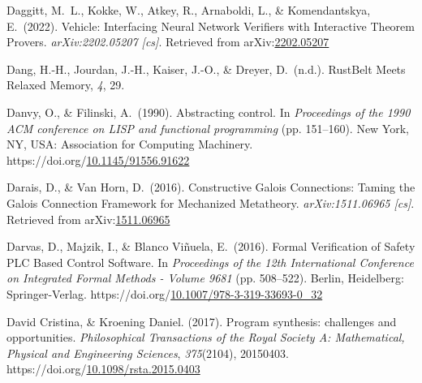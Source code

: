 \documentclass[12pt,twoside]{article}
\begin{document}
{\begin{thebibliography}{1079}
\mdbibitemlabel{}Daggitt, M.~L., Kokke, W., Atkey, R., Arnaboldi, L., \& Komendantskya, E.~(2022). Vehicle: Interfacing Neural Network Verifiers with Interactive Theorem Provers. \emph{arXiv:2202.05207 {}[cs]}. Retrieved from arXiv:\href{http://arxiv.org/abs/2202.05207}{2202.05207}%

\mdbibitemlabel{}Dang, H.-H., Jourdan, J.-H., Kaiser, J.-O., \& Dreyer, D.~(n.d.). RustBelt Meets Relaxed Memory, \emph{4}, 29.%

\mdbibitemlabel{}Danvy, O., \& Filinski, A.~(1990). Abstracting control. In \emph{Proceedings of the 1990 ACM conference on LISP and functional programming} (pp. 151–160). New York, NY, USA: Association for Computing Machinery. https://doi.org/\href{https://dx.doi.org/10.1145/91556.91622}{10.1145/91556.91622}%

\mdbibitemlabel{}Darais, D., \& Van Horn, D.~(2016). Constructive Galois Connections: Taming the Galois Connection Framework for Mechanized Metatheory. \emph{arXiv:1511.06965 {}[cs]}. Retrieved from arXiv:\href{http://arxiv.org/abs/1511.06965}{1511.06965}%

\mdbibitemlabel{}Darvas, D., Majzik, I., \& Blanco Viñuela, E.~(2016). Formal Verification of Safety PLC Based Control Software. In \emph{Proceedings of the 12th International Conference on Integrated Formal Methods - Volume 9681} (pp. 508–522). Berlin, Heidelberg: Springer-Verlag. https://doi.org/\href{https://dx.doi.org/10.1007/978-3-319-33693-0_32}{10.1007/978-3-319-33693-0\_32}%

\mdbibitemlabel{}David Cristina, \& Kroening Daniel. (2017). Program synthesis: challenges and opportunities. \emph{Philosophical Transactions of the Royal Society A: Mathematical, Physical and Engineering Sciences}, \emph{375}(2104), 20150403. https://doi.org/\href{https://dx.doi.org/10.1098/rsta.2015.0403}{10.1098/rsta.2015.0403}%


\end{thebibliography}}
\end{document}
